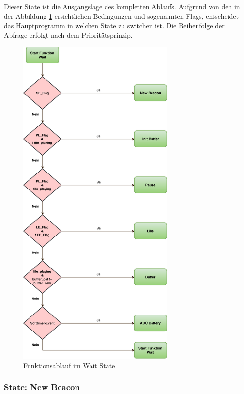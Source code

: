 Dieser State ist die Ausgangslage des kompletten Ablaufs. Aufgrund von den in der Abbildung \ref{fig:waitState} ersichtlichen Bedingungen und sogenannten Flags, entscheidet das Hauptprogramm in welchen State zu switchen ist. Die Reihenfolge der Abfrage erfolgt nach dem Prioritätsprinzip.

\begin{figure}[htbp!!!!]
	\centering
	\includegraphics[width=0.7\textwidth]{Data/Wait_picture.pdf}
	\caption[Statemachine: Wait]{Funktionsablauf im Wait State}
	\label{fig:waitState}
\end{figure} 

\subsubsection*{State: New Beacon}


